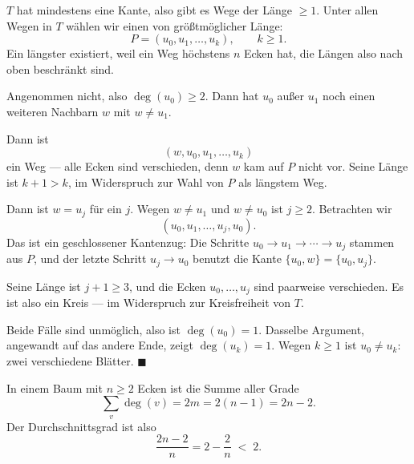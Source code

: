 \begin{merksatz}
$T$ hat mindestens eine Kante, also gibt es Wege der Länge $\ge 1$. Unter allen Wegen in $T$ wählen wir einen von größtmöglicher Länge:
\[ P = (u_0, u_1, \ldots, u_k), \qquad k \ge 1 . \]
Ein längster existiert, weil ein Weg höchstens $n$ Ecken hat, die Längen also nach oben beschränkt sind.

Angenommen nicht, also $\deg(u_0) \ge 2$. Dann hat $u_0$ außer $u_1$ noch einen weiteren Nachbarn $w$ mit $w \neq u_1$.

Dann ist
\[ (w, u_0, u_1, \ldots, u_k) \]
ein Weg --- alle Ecken sind verschieden, denn $w$ kam auf $P$ nicht vor. Seine Länge ist $k+1 > k$, im Widerspruch zur Wahl von $P$ als längstem Weg.

Dann ist $w = u_j$ für ein $j$. Wegen $w \neq u_1$ und $w \neq u_0$ ist $j \ge 2$. Betrachten wir
\[ (u_0, u_1, \ldots, u_j, u_0) . \]
Das ist ein geschlossener Kantenzug: Die Schritte $u_0 \to u_1 \to \cdots \to u_j$ stammen aus $P$, und der letzte Schritt $u_j \to u_0$ benutzt die Kante $\{u_0, w\} = \{u_0, u_j\}$.

Seine Länge ist $j + 1 \ge 3$, und die Ecken $u_0, \ldots, u_j$ sind paarweise verschieden. Es ist also ein Kreis --- im Widerspruch zur Kreisfreiheit von $T$.

Beide Fälle sind unmöglich, also ist $\deg(u_0) = 1$. Dasselbe Argument, angewandt auf das andere Ende, zeigt $\deg(u_k) = 1$. Wegen $k \ge 1$ ist $u_0 \neq u_k$: zwei verschiedene Blätter. $\blacksquare$
\end{merksatz}

\begin{merksatz}
In einem Baum mit $n \ge 2$ Ecken ist die Summe aller Grade
\[ \sum_{v} \deg(v) = 2m = 2(n-1) = 2n - 2 . \]
Der Durchschnittsgrad ist also
\[ \frac{2n-2}{n} = 2 - \frac{2}{n} \;<\; 2 . \]

\begin{center}
\begin{minipage}{0.88\textwidth}
\end{minipage}
\end{center}
\end{merksatz}

